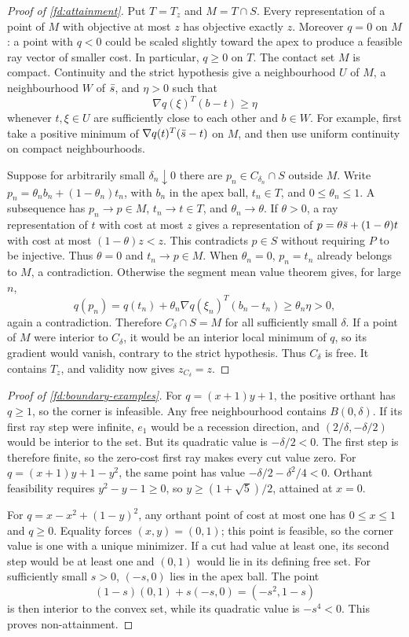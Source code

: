 \begin{proof}[Proof of \cref{fd:attainment}]
\label{fd:attainment-proof}
Put $T=T_z$ and $M=T\cap S$. Every representation of a point of $M$
with objective at most $z$ has objective exactly $z$. Moreover $q=0$
on $M$: a point with $q<0$ could be scaled slightly toward the apex
to produce a feasible ray vector of smaller cost. In particular,
$q\ge0$ on $T$. The contact set $M$ is compact. Continuity and the
strict hypothesis give a neighbourhood $U$ of $M$, a neighbourhood
$W$ of $\bar s$, and $\eta>0$ such that
\[
 \nabla q(\xi)^T(b-t)\ge\eta
\]
whenever $t,\xi\in U$ are sufficiently close to each other and $b\in W$.
For example, first take a positive minimum of
$\nabla q(t)^T(\bar s-t)$ on $M$, and then use uniform continuity on
compact neighbourhoods.

Suppose for arbitrarily small $\delta_n\downarrow0$ there are
$p_n\in C_{\delta_n}\cap S$ outside $M$. Write
$p_n=\theta_n b_n+(1-\theta_n)t_n$, with $b_n$ in the apex ball,
$t_n\in T$, and $0\le\theta_n\le1$. A subsequence has
$p_n\to p\in M$, $t_n\to t\in T$, and $\theta_n\to\theta$.
If $\theta>0$, a ray representation of $t$ with cost at most $z$
gives a representation of
$p=\theta\bar s+(1-\theta)t$ with cost at most $(1-\theta)z<z$.
This contradicts $p\in S$ without requiring $P$ to be injective.
Thus $\theta=0$ and $t_n\to p\in M$.
When $\theta_n=0$, $p_n=t_n$ already belongs to $M$, a contradiction.
Otherwise the segment mean value theorem gives, for large $n$,
\[
 q(p_n)=q(t_n)+\theta_n\nabla q(\xi_n)^T(b_n-t_n)
        \ge\theta_n\eta>0,
\]
again a contradiction. Therefore $C_\delta\cap S=M$ for all
sufficiently small $\delta$.
If a point of $M$ were interior to $C_\delta$, it would be an interior
local minimum of $q$, so its gradient would vanish, contrary to the
strict hypothesis. Thus $C_\delta$ is free. It contains $T_z$, and
validity now gives $z_{C_\delta}=z$.
\end{proof}

\begin{proof}[Proof of \cref{fd:boundary-examples}]
\label{fd:boundary-proof}
For $q=(x+1)y+1$, the positive orthant has $q\ge1$, so the corner is
infeasible. Any free neighbourhood contains $B(0,\delta)$. If its
first ray step were infinite, $e_1$ would be a recession direction,
and $(2/\delta,-\delta/2)$ would be interior to the set. But its
quadratic value is $-\delta/2<0$. The first step is therefore finite,
so the zero-cost first ray makes every cut value zero.
For $q=(x+1)y+1-y^2$, the same point has value
$-\delta/2-\delta^2/4<0$. Orthant feasibility requires
$y^2-y-1\ge0$, so $y\ge(1+\sqrt5)/2$, attained at $x=0$.

For $q=x-x^2+(1-y)^2$, any orthant point of cost at most one has
$0\le x\le1$ and $q\ge0$. Equality forces $(x,y)=(0,1)$;
this point is feasible, so the corner value is one with a unique
minimizer. If a cut had value at least one, its second step would be
at least one and $(0,1)$ would lie in its defining free set.
For sufficiently small $s>0$, $(-s,0)$ lies in the apex ball.
The point
\[
 (1-s)(0,1)+s(-s,0)=(-s^2,1-s)
\]
is then interior to the convex set, while its quadratic value is
$-s^4<0$. This proves non-attainment.
\end{proof}

